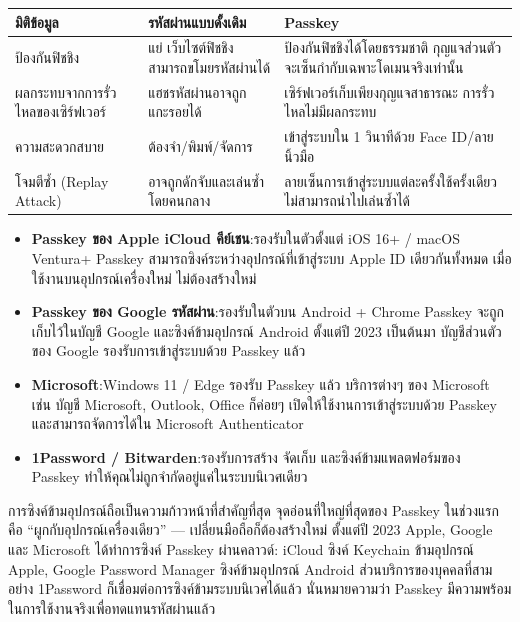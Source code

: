\begin{center}
\begin{tabularx}{\linewidth}{|X|X|X|}
\hline
\textbf{มิติข้อมูล} & \textbf{รหัสผ่านแบบดั้งเดิม} & \textbf{Passkey} \tabularnewline
\hline
ป้องกันฟิชชิง & แย่ เว็บไซต์ฟิชชิงสามารถขโมยรหัสผ่านได้ & ป้องกันฟิชชิงได้โดยธรรมชาติ กุญแจส่วนตัวจะเซ็นกำกับเฉพาะโดเมนจริงเท่านั้น \tabularnewline
ผลกระทบจากการรั่วไหลของเซิร์ฟเวอร์ & แฮชรหัสผ่านอาจถูกแกะรอยได้ & เซิร์ฟเวอร์เก็บเพียงกุญแจสาธารณะ การรั่วไหลไม่มีผลกระทบ \tabularnewline
ความสะดวกสบาย & ต้องจำ/พิมพ์/จัดการ & เข้าสู่ระบบใน 1 วินาทีด้วย Face ID/ลายนิ้วมือ \tabularnewline
โจมตีซ้ำ (Replay Attack) & อาจถูกดักจับและเล่นซ้ำโดยคนกลาง & ลายเซ็นการเข้าสู่ระบบแต่ละครั้งใช้ครั้งเดียว ไม่สามารถนำไปเล่นซ้ำได้ \tabularnewline
\hline
\end{tabularx}
\end{center}


\begin{itemize}
  \item \textbf{Passkey ของ Apple iCloud คีย์เชน}:รองรับในตัวตั้งแต่ iOS 16+ / macOS Ventura+ Passkey สามารถซิงค์ระหว่างอุปกรณ์ที่เข้าสู่ระบบ Apple ID เดียวกันทั้งหมด เมื่อใช้งานบนอุปกรณ์เครื่องใหม่ ไม่ต้องสร้างใหม่
  \item \textbf{Passkey ของ Google รหัสผ่าน}:รองรับในตัวบน Android + Chrome Passkey จะถูกเก็บไว้ในบัญชี Google และซิงค์ข้ามอุปกรณ์ Android ตั้งแต่ปี 2023 เป็นต้นมา บัญชีส่วนตัวของ Google รองรับการเข้าสู่ระบบด้วย Passkey แล้ว
  \item \textbf{Microsoft}:Windows 11 / Edge รองรับ Passkey แล้ว บริการต่างๆ ของ Microsoft เช่น บัญชี Microsoft, Outlook, Office ก็ค่อยๆ เปิดให้ใช้งานการเข้าสู่ระบบด้วย Passkey และสามารถจัดการได้ใน Microsoft Authenticator
  \item \textbf{1Password / Bitwarden}:รองรับการสร้าง จัดเก็บ และซิงค์ข้ามแพลตฟอร์มของ Passkey ทำให้คุณไม่ถูกจำกัดอยู่แค่ในระบบนิเวศเดียว
\end{itemize}

\begin{tcbinfo}{การซิงค์ข้ามอุปกรณ์ถือเป็นความก้าวหน้าที่สำคัญที่สุด}
จุดอ่อนที่ใหญ่ที่สุดของ Passkey ในช่วงแรกคือ “ผูกกับอุปกรณ์เครื่องเดียว” — เปลี่ยนมือถือก็ต้องสร้างใหม่ ตั้งแต่ปี 2023 Apple, Google และ Microsoft ได้ทำการซิงค์ Passkey ผ่านคลาวด์: iCloud ซิงค์ Keychain ข้ามอุปกรณ์ Apple, Google Password Manager ซิงค์ข้ามอุปกรณ์ Android ส่วนบริการของบุคคลที่สามอย่าง 1Password ก็เชื่อมต่อการซิงค์ข้ามระบบนิเวศได้แล้ว นั่นหมายความว่า Passkey มีความพร้อมในการใช้งานจริงเพื่อทดแทนรหัสผ่านแล้ว

\end{tcbinfo}

